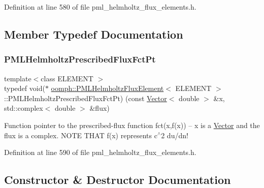 Definition at line 580 of file pml\+\_\+helmholtz\+\_\+flux\+\_\+elements.\+h.



\subsection{Member Typedef Documentation}
\mbox{\label{classoomph_1_1PMLHelmholtzFluxElement_af376593418510a6fcbc23cc13f3d6b22}} 
\subsubsection{\texorpdfstring{P\+M\+L\+Helmholtz\+Prescribed\+Flux\+Fct\+Pt}{PMLHelmholtzPrescribedFluxFctPt}}
{\footnotesize\ttfamily template$<$class E\+L\+E\+M\+E\+NT $>$ \\
typedef void($\ast$ \hyperlink{classoomph_1_1PMLHelmholtzFluxElement}{oomph\+::\+P\+M\+L\+Helmholtz\+Flux\+Element}$<$ E\+L\+E\+M\+E\+NT $>$\+::P\+M\+L\+Helmholtz\+Prescribed\+Flux\+Fct\+Pt) (const \hyperlink{classoomph_1_1Vector}{Vector}$<$ double $>$ \&x, std\+::complex$<$ double $>$ \&flux)}



Function pointer to the prescribed-\/flux function fct(x,f(x)) -- x is a \hyperlink{classoomph_1_1Vector}{Vector} and the flux is a complex. N\+O\+TE T\+H\+AT f(x) represents c$^\wedge$2 du/dn! 



Definition at line 590 of file pml\+\_\+helmholtz\+\_\+flux\+\_\+elements.\+h.



\subsection{Constructor \& Destructor Documentation}
\mbox{\label{classoomph_1_1PMLHelmholtzFluxElement_ab73fabdc7bc6124475798acd1158fc14}} 
